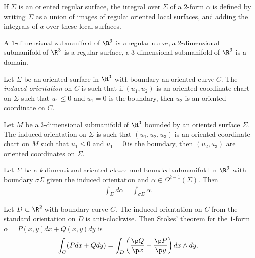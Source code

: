 \documentclass{article}
\begin{document}
\begin{definition}
    If $\Sigma$ is an oriented regular surface, the integral over $\Sigma$ of a $2$-form $\alpha$
    is defined by writing $\Sigma$ as a union of images of regular oriented local surfaces, and 
    adding the integrals of $\alpha$ over these local surfaces. 
\end{definition}

\begin{definition}
    A $1$-dimensional submanifold of $\R^3$ is a regular curve, a $2$-dimensional submanifold of 
    $\R^3$ is a regular surface, a $3$-dimensional submanifold of $\R^3$ is a domain.
\end{definition}

\begin{definition}
    Let $\Sigma$ be an oriented surface in $\R^3$ with boundary an oriented curve $C$.
    The \emph{induced orientation} on $C$ is such that if $(u_1,u_2)$ is an oriented coordinate
    chart on $\Sigma$ such that $u_1\leq 0$ and $u_1=0$ is the boundary, then $u_2$ is an
    oriented coordinate on $C$. 
    
    Let $M$ be a $3$-dimensional submanifold of $\R^3$ bounded by 
    an oriented surface $\Sigma$. The induced orientation on $\Sigma$ is such that $(u_1,u_2,u_3)$
    is an oriented coordinate chart on $M$ such that $u_1\leq 0$ and $u_1=0$ is the boundary,
    then $(u_2,u_3)$ are oriented coordinates on $\Sigma$.
\end{definition}

\begin{theorem}[Stokes]
    Let $\Sigma$ be a $k$-dimensional oriented closed and bounded submanifold in $\R^3$ with 
    boundary $\sigma\Sigma$ given the induced orientation and $\alpha\in\Omega^{k-1}(\Sigma)$.
    Then
    \begin{align*}
        \int_\Sigma d\alpha = \int_{\sigma\Sigma}\alpha.
    \end{align*}
\end{theorem}

\begin{corollary}[Green]
    Let $D\subset\R^2$ with boundary curve $C$. The induced orientation on $C$ from 
    the standard orientation on $D$ is anti-clockwise. Then Stokes' theorem for the $1$-form 
    $\alpha=P(x,y)dx + Q(x,y)dy$ is 
    \begin{align*}
        \int_C(Pdx + Qdy) = \int_D\left(\frac{\p Q}{\p x}-\frac{\p P}{\p y}\right)dx\wedge dy. 
    \end{align*} 
\end{corollary}
\end{document}
